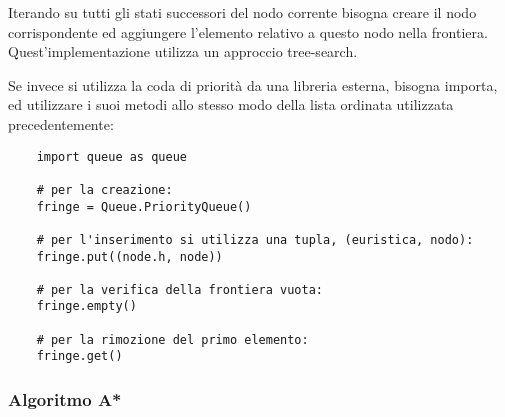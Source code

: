\documentclass{article}
\numberwithin{equation}{subsection}
\begin{document}
Iterando su tutti gli stati successori del nodo corrente bisogna creare il nodo corrispondente 
ed aggiungere l'elemento relativo a questo nodo nella frontiera. 
Quest'implementazione utilizza un approccio tree-search. 

Se invece si utilizza la coda di priorità da una libreria esterna, bisogna importa, 
ed utilizzare i suoi metodi allo stesso modo della lista ordinata utilizzata 
precedentemente:
\begin{verbatim}
    import queue as queue

    # per la creazione:
    fringe = Queue.PriorityQueue()

    # per l'inserimento si utilizza una tupla, (euristica, nodo):
    fringe.put((node.h, node))

    # per la verifica della frontiera vuota:
    fringe.empty()

    # per la rimozione del primo elemento:
    fringe.get()
\end{verbatim}

\subsubsection{Algoritmo A*}




\clearpage
\end{document}
